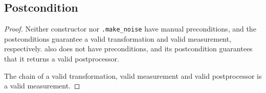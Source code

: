 \documentclass{article}
\begin{document}
\subsection*{Postcondition}
\begin{theorem}
\end{theorem}

\begin{proof}
    Neither constructor  nor
    \texttt{.make\_noise} have manual preconditions, 
    and the postconditions guarantee a valid transformation and valid measurement, respectively.
     also does not have preconditions,
    and its postcondition guarantees that it returns a valid postprocessor.

    The chain of a valid transformation, valid measurement and valid postprocessor is a valid measurement.
\end{proof}
\end{document}
